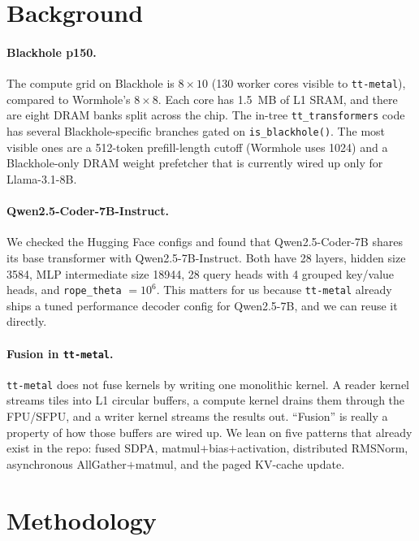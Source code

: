 \documentclass[sigplan,nonacm,review]{acmart}
\begin{document}
\section{Background}
\paragraph{Blackhole p150.}
The compute grid on Blackhole is $8{\times}10$ (130 worker cores visible
to \texttt{tt-metal}), compared to Wormhole's $8{\times}8$. Each core
has 1.5~MB of L1 SRAM, and there are eight DRAM banks split across the
chip. The in-tree \texttt{tt\_transformers} code has several
Blackhole-specific branches gated on \texttt{is\_blackhole()}. The most
visible ones are a 512-token prefill-length cutoff (Wormhole uses 1024)
and a Blackhole-only DRAM weight prefetcher that is currently wired up
only for Llama-3.1-8B.

\paragraph{Qwen2.5-Coder-7B-Instruct.}
We checked the Hugging Face configs and found that Qwen2.5-Coder-7B
shares its base transformer with Qwen2.5-7B-Instruct. Both have 28
layers, hidden size 3584, MLP intermediate size 18944, 28 query heads
with 4 grouped key/value heads, and \texttt{rope\_theta} $=10^{6}$.
This matters for us because \texttt{tt-metal} already ships a tuned
performance decoder config for Qwen2.5-7B, and we can reuse it
directly.

\paragraph{Fusion in \texttt{tt-metal}.}
\texttt{tt-metal} does not fuse kernels by writing one monolithic
kernel. A reader kernel streams tiles into L1 circular buffers, a
compute kernel drains them through the FPU/SFPU, and a writer kernel
streams the results out. ``Fusion'' is really a property of how those
buffers are wired up. We lean on five patterns that already exist in
the repo: fused SDPA, matmul${+}$bias${+}$activation, distributed
RMSNorm, asynchronous AllGather${+}$matmul, and the paged KV-cache
update.

\section{Methodology}
\end{document}
